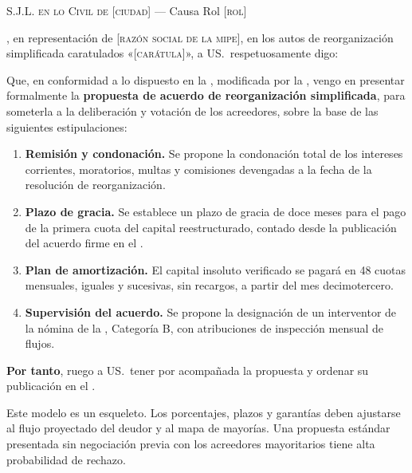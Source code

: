 \begin{escrito}
\small
\noindent\textsc{S.J.L. en lo Civil de} [\textsc{ciudad}] --- Causa Rol [\textsc{rol}]

\medskip
{}, en representación de
[\textsc{razón social de la mipe}], en los autos de reorganización simplificada
caratulados «[\textsc{carátula}]», a US.\ respetuosamente digo:

\medskip
Que, en conformidad a lo dispuesto en la \LIR{}, modificada por la \Lreforma{}, vengo en
presentar formalmente la \textbf{propuesta de acuerdo de reorganización simplificada},
para someterla a la deliberación y votación de los acreedores, sobre la base de las
siguientes estipulaciones:

\begin{enumerate}[leftmargin=1.6em]
  \item \textbf{Remisión y condonación.} Se propone la condonación total de los intereses
  corrientes, moratorios, multas y comisiones devengadas a la fecha de la resolución de
  reorganización.

  \item \textbf{Plazo de gracia.} Se establece un plazo de gracia de doce meses para el
  pago de la primera cuota del capital reestructurado, contado desde la publicación del
  acuerdo firme en el \boletin{}.

  \item \textbf{Plan de amortización.} El capital insoluto verificado se pagará en 48
  cuotas mensuales, iguales y sucesivas, sin recargos, a partir del mes decimotercero.

  \item \textbf{Supervisión del acuerdo.} Se propone la designación de un interventor de
  la nómina de la \superir{}, Categoría B, con atribuciones de inspección mensual de
  flujos.
\end{enumerate}

\medskip
\noindent\textbf{Por tanto}, ruego a US.\ tener por acompañada la propuesta y ordenar su
publicación en el \boletin{}.
\end{escrito}

\begin{alerta}
Este modelo es un esqueleto. Los porcentajes, plazos y garantías deben ajustarse al flujo
proyectado del deudor y al mapa de mayorías. Una propuesta estándar presentada sin
negociación previa con los acreedores mayoritarios tiene alta probabilidad de rechazo.
\end{alerta}

